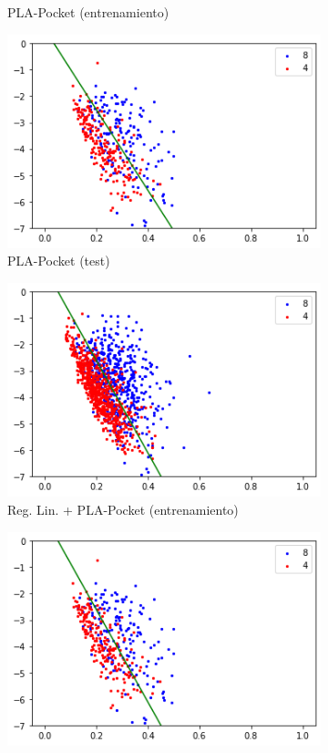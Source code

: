 \documentclass[10pt,a4paper]{article}
\begin{document}
\begin{figure}
\begin{subfigure}{0.5\textwidth}
		\caption{PLA-Pocket (entrenamiento)}
	\end{subfigure}
	\begin{subfigure}{0.5\textwidth}
		\centering
		\includegraphics[width=\textwidth]{bonus_pocket_test}
		\caption{PLA-Pocket (test)}
	\end{subfigure}
	\begin{subfigure}{0.5\textwidth}
		\centering
		\includegraphics[width=\textwidth]{bonus_rl_p_train}
		\caption{Reg. Lin. + PLA-Pocket (entrenamiento)}
	\end{subfigure}
	\begin{subfigure}{0.5\textwidth}
		\centering
		\includegraphics[width=\textwidth]{bonus_rl_p_test}

\end{subfigure}
\end{figure}
\end{document}
